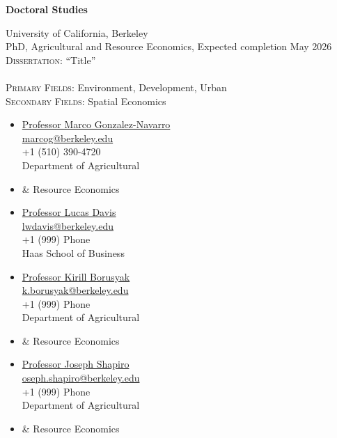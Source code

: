 \documentclass[10pt, oneside]{article}
\begin{document}
\begin{minipage}[t]{0.1\linewidth}
\textbf{Doctoral Studies}
\end{minipage}\hspace{0.05\linewidth}
\begin{minipage}[t]{0.8\linewidth}
University of California, Berkeley\\
PhD, Agricultural and Resource Economics, Expected completion May 2026 \\
\textsc{Dissertation:}  ``Title'' \\ 
~\\ 
\textsc{Primary Fields:} Environment, Development, Urban \\
\textsc{Secondary Fields:} Spatial Economics 
\begin{multicols}{2}
\begin{itemize}[noitemsep,nolistsep]
\item[] \underline{Professor Marco Gonzalez-Navarro} \\
\href{mailto:marcog@berkeley.edu}{marcog@berkeley.edu} \\ 
+1 (510) 390-4720 \\
Department of Agricultural
\item[] \hspace{4mm} \& Resource Economics \\
\item[] \underline{Professor Lucas Davis} \\
\href{mailto:lwdavis@berkeley.edu}{lwdavis@berkeley.edu} \\
+1 (999) Phone \\
Haas School of Business \\ 
\item[] \underline{Professor Kirill Borusyak} \\
\href{k.borusyak@berkeley.edu}{k.borusyak@berkeley.edu} \\ 
+1 (999) Phone \\
Department of Agricultural
\item[] \hspace{4mm} \& Resource Economics\\
\item[] \underline{Professor Joseph Shapiro} \\
\href{mailto:oseph.shapiro@berkeley.edu}{oseph.shapiro@berkeley.edu} \\ 
+1 (999) Phone \\
Department of Agricultural
\item[] \hspace{4mm} \& Resource Economics
\end{itemize}
\end{multicols}
\end{minipage}\vspace{5mm}
\end{document}
